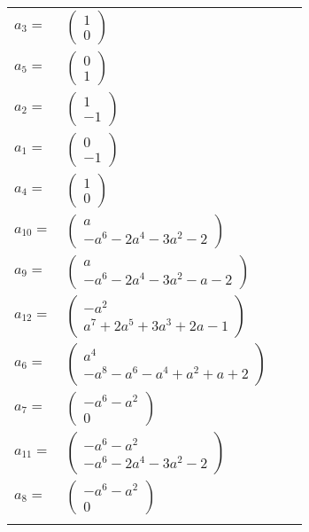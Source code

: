 \documentclass[1p]{elsarticle_modified}
\theoremstyle{definition}
\begin{document}
\begin{tabular}{m{7pt} m{180pt} m{7pt} m{180pt} }
\flushright $a_{3}=$&$\begin{pmatrix}1\\0\end{pmatrix}$ \\
\flushright $a_{5}=$&$\begin{pmatrix}0\\1\end{pmatrix}$ \\
\flushright $a_{2}=$&$\begin{pmatrix}1\\-1\end{pmatrix}$ \\
\flushright $a_{1}=$&$\begin{pmatrix}0\\-1\end{pmatrix}$ \\
\flushright $a_{4}=$&$\begin{pmatrix}1\\0\end{pmatrix}$ \\
\flushright $a_{10}=$&$\begin{pmatrix}a\\- a^6-2 a^4-3 a^2-2\end{pmatrix}$ \\
\flushright $a_{9}=$&$\begin{pmatrix}a\\- a^6-2 a^4-3 a^2- a-2\end{pmatrix}$ \\
\flushright $a_{12}=$&$\begin{pmatrix}- a^2\\a^7+2 a^5+3 a^3+2 a-1\end{pmatrix}$ \\
\flushright $a_{6}=$&$\begin{pmatrix}a^4\\- a^8- a^6- a^4+a^2+a+2\end{pmatrix}$ \\
\flushright $a_{7}=$&$\begin{pmatrix}- a^6- a^2\\0\end{pmatrix}$ \\
\flushright $a_{11}=$&$\begin{pmatrix}- a^6- a^2\\- a^6-2 a^4-3 a^2-2\end{pmatrix}$ \\
\flushright $a_{8}=$&$\begin{pmatrix}- a^6- a^2\\0\end{pmatrix}$\\&\end{tabular}
\end{document}
